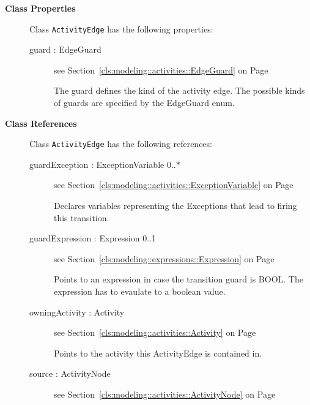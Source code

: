 \begin{description}

	\item[\textbf{Class Properties}] Class \texttt{ActivityEdge} has the following properties:
	\begin{description}
\item[guard : EdgeGuard 	]
see Section~\ref{cls:modeling::activities::EdgeGuard} on Page~\pageref{cls:modeling::activities::EdgeGuard}\hspace{\fill}
\nopagebreak


	
			
The guard defines the kind of the activity edge. The possible kinds of guards are specified by the EdgeGuard enum.	
		
	
	\end{description}
	
	\item[\textbf{Class References}] Class \texttt{ActivityEdge} has the following references:
	\begin{description}
\item[guardException : ExceptionVariable 			0..$*$]
see Section~\ref{cls:modeling::activities::ExceptionVariable} on Page~\pageref{cls:modeling::activities::ExceptionVariable}\hspace{\fill}
\nopagebreak


	
			
Declares variables representing the Exceptions that lead to firing this transition.	
		
	
\item[guardExpression : Expression 			0..1]
see Section~\ref{cls:modeling::expressions::Expression} on Page~\pageref{cls:modeling::expressions::Expression}\hspace{\fill}
\nopagebreak


	
			
Points to an expression in case the transition guard is BOOL. The expression has to evaulate to a boolean value.	
		
	
\item[owningActivity : Activity 	]
see Section~\ref{cls:modeling::activities::Activity} on Page~\pageref{cls:modeling::activities::Activity}\hspace{\fill}
\nopagebreak


	
			
Points to the activity this ActivityEdge is contained in.	
		
	
\item[source : ActivityNode 	]
see Section~\ref{cls:modeling::activities::ActivityNode} on Page~\pageref{cls:modeling::activities::ActivityNode}\hspace{\fill}
\nopagebreak



\end{description}
\end{description}
